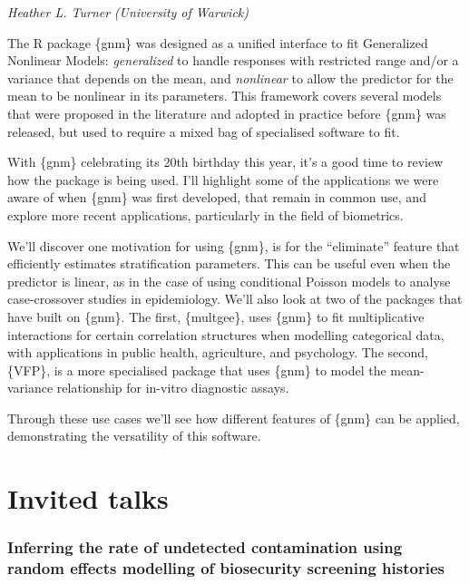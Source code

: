 \documentclass[
]{scrreprt}
\begin{document}
\emph{Heather L. Turner} \emph{(University of
Warwick)}

\setlength{\parskip}{0.5em}

The R package \{gnm\} was designed as a unified interface to fit
Generalized Nonlinear Models: \emph{generalized} to handle responses
with restricted range and/or a variance that depends on the mean, and
\emph{nonlinear} to allow the predictor for the mean to be nonlinear in
its parameters. This framework covers several models that were proposed
in the literature and adopted in practice before \{gnm\} was released,
but used to require a mixed bag of specialised software to fit.

With \{gnm\} celebrating its 20th birthday this year, it's a good time
to review how the package is being used. I'll highlight some of the
applications we were aware of when \{gnm\} was first developed, that
remain in common use, and explore more recent applications, particularly
in the field of biometrics.

We'll discover one motivation for using \{gnm\}, is for the
``eliminate'' feature that efficiently estimates stratification
parameters. This can be useful even when the predictor is linear, as in
the case of using conditional Poisson models to analyse case-crossover
studies in epidemiology. We'll also look at two of the packages that
have built on \{gnm\}. The first, \{multgee\}, uses \{gnm\} to fit
multiplicative interactions for certain correlation structures when
modelling categorical data, with applications in public health,
agriculture, and psychology. The second, \{VFP\}, is a more specialised
package that uses \{gnm\} to model the mean-variance relationship for
in-vitro diagnostic assays.

Through these use cases we'll see how different features of \{gnm\} can
be applied, demonstrating the versatility of this software.

\chapter{Invited talks}\label{invited-talks}

\subsection{Inferring the rate of undetected contamination using random
effects modelling of biosecurity screening
histories}\label{inferring-the-rate-of-undetected-contamination-using-random-effects-modelling-of-biosecurity-screening-histories}
\end{document}
